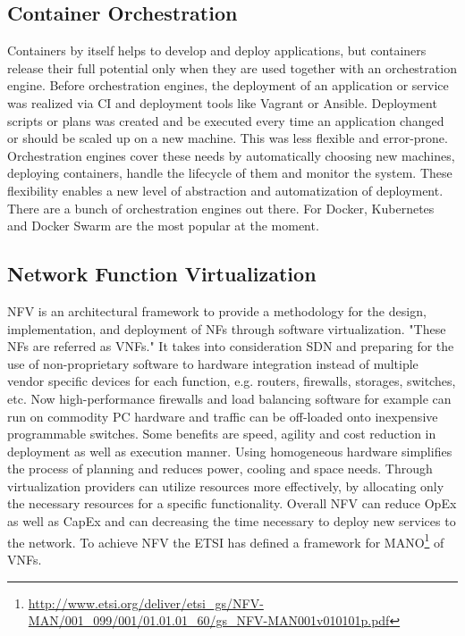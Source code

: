 \subsection{Container Orchestration}
Containers by itself helps to develop and deploy applications, but containers release their full potential only when they are used together with an orchestration engine.
Before orchestration engines, the deployment of an application or service was realized via \ac{CI} and deployment tools like Vagrant or Ansible.
Deployment scripts or plans was created and be executed every time an application changed or should be scaled up on a new machine.
This was less flexible and error-prone.
Orchestration engines cover these needs by automatically choosing new machines, deploying containers, handle the lifecycle of them and monitor the system.
These flexibility enables a new level of abstraction and automatization of deployment.
There are a bunch of orchestration engines out there.
For Docker, Kubernetes and Docker Swarm are the most popular at the moment.


\subsection{Network Function Virtualization}
\ac{NFV} is an architectural framework to provide a methodology for the design, implementation, and deployment of \acp{NF} through software virtualization.\cite[cf.][p. 8]{ETSI:NFV:2013}\cite[cf.]{Rivenes:2014}
"These \acp{NF} are referred as \acp{VNF}."\cite[p. 8]{ETSI:NFV:2013}
It takes into consideration \ac{SDN} and preparing for the use of non-proprietary software to hardware integration instead of multiple vendor specific devices for each function, e.g. routers, firewalls, storages, switches, etc.\cite[cf.]{Rivenes:2014}
Now high-performance firewalls and load balancing software for example can run on commodity PC hardware and traffic can be off-loaded onto inexpensive programmable switches.\cite[cf.]{Noble:2015}
Some benefits are speed, agility and cost reduction in deployment as well as execution manner.\cite[cf.]{Noble:2015}
Using homogeneous hardware simplifies the process of planning and reduces power, cooling and space needs.\cite[cf.]{Noble:2015}
Through virtualization providers can utilize resources more effectively, by allocating only the necessary resources for a specific functionality.\cite[cf.]{Noble:2015}
Overall \ac{NFV} can reduce \ac{OpEx} as well as \ac{CapEx} and can decreasing the time necessary to deploy new services to the network.\cite[cf.]{Noble:2015}
To achieve \ac{NFV} the \ac{ETSI} has defined a framework for \ac{MANO}\footnote{\url{http://www.etsi.org/deliver/etsi_gs/NFV-MAN/001_099/001/01.01.01_60/gs_NFV-MAN001v010101p.pdf}} of \acp{VNF}.

